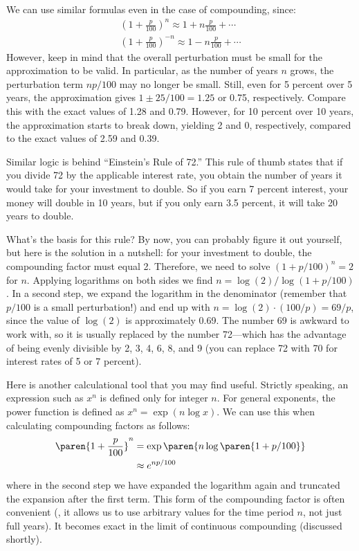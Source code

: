 We can use similar formulas even in the case of compounding, since:
%
\begin{gather*}
\left( 1 + \frac{p}{100} \right)^n \approx 1 + n \frac{p}{100} + \dotsb \\
\left( 1 + \frac{p}{100} \right)^{-n} \approx 1 - n \frac{p}{100} + \dotsb 
\end{gather*}
%
However, keep in mind that the overall perturbation must be small for
the approximation to be valid. In particular, as the number of years
$n$ grows, the perturbation term $n p/100$ may no longer be small.
Still, even for 5 percent over 5 years, the approximation gives $1 \pm
25/100 = 1.25$ or 0.75, respectively. Compare this with the exact
values of 1.28 and 0.79.  However, for 10 percent over 10 years, the
approximation starts to break down, yielding 2 and 0, respectively,
compared to the exact values of 2.59 and 0.39.
    
Similar logic is behind ``Einstein's Rule of 72.'' This rule of thumb
states that if you divide 72 by the applicable interest rate, you
obtain the number of years it would take for your investment to
double.  So if you earn 7 percent interest, your money will double in
10 years, but if you only earn 3.5 percent, it will take 20 years to
double.
    
What's the basis for this rule? By now, you can probably figure it out
yourself, but here is the solution in a nutshell: for your investment
to double, the compounding factor must equal 2. Therefore, we need to
solve $(1 + p/100)^n = 2$ for $n$. Applying logarithms on both sides
we find $n = \log(2)/\log(1+p/100)$. In a second step, we expand the
logarithm in the denominator (remember that $p/100$ is a small
perturbation!) and end up with $n = \log(2) \cdot (100/p) = 69/p$,
since the value of $\log(2)$ is approximately 0.69. The number 69 is
awkward to work with, so it is usually replaced by the number
72---which has the advantage of being evenly divisible by 2, 3, 4, 6,
8, and 9 (you can replace 72 with 70 for interest rates of 5 or 7
percent).
    
Here is another calculational tool that you may find useful.  Strictly
speaking, an expression such as $x^n$ is defined only for integer
$n$. For general exponents, the power function is defined as $x^n =
\exp(n \log x)$. We can use this when calculating compounding factors
as follows:
%
\begin{align*}
\paren{ 1 + \frac{p}{100} }^n 
  & = \exp \paren{ n \log \paren{1 + p/100} } \\
  & \approx e^{n p/100}
\end{align*}
%    
where in the second step we have expanded the logarithm again and
truncated the expansion after the first term. This form of the
compounding factor is often convenient (\eg, it allows us to use
arbitrary values for the time period $n$, not just full years). It
becomes exact in the limit of continuous compounding (discussed
shortly).
    
